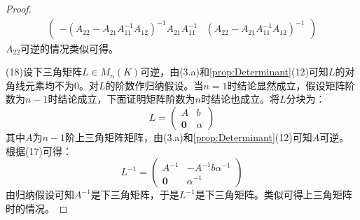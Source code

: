 \begin{proof}
\begin{gather*}
\begin{pmatrix}
			-(A_{22}-A_{21}A_{11}^{-1}A_{12})^{-1}A_{21}A_{11}^{-1} & (A_{22}-A_{21}A_{11}^{-1}A_{12})^{-1}
		\end{pmatrix}
	\end{gather*}
	$A_{22}$可逆的情况类似可得。\par
	(18)设下三角矩阵$L\in M_{n}(K)$可逆，由(3.a)和\cref{prop:Determinant}(12)可知$L$的对角线元素均不为$0$。对$L$的阶数作归纳假设。当$n=1$时结论显然成立，假设矩阵阶数为$n-1$时结论成立，下面证明矩阵阶数为$n$时结论也成立。将$L$分块为：
	\begin{equation*}
		L=
		\begin{pmatrix}
			A & b \\
			\mathbf{0} & \alpha
		\end{pmatrix}
	\end{equation*}
	其中$A$为$n-1$阶上三角矩阵矩阵，由(3.a)和\cref{prop:Determinant}(12)可知$A$可逆。根据(17)可得：
	\begin{equation*}
		L^{-1}=
		\begin{pmatrix}
			A^{-1} & -A^{-1}b\alpha^{-1} \\
			\mathbf{0} & \alpha^{-1}
		\end{pmatrix}
	\end{equation*}
	由归纳假设可知$A^{-1}$是下三角矩阵，于是$L^{-1}$是下三角矩阵。类似可得上三角矩阵时的情况。
\end{proof}

